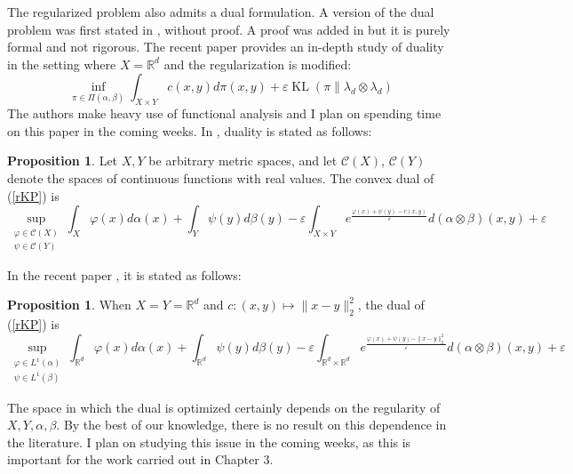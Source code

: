 \documentclass[12pt]{report}
\theoremstyle{definition}
\newtheorem{prop}[defi]{Proposition}
\theoremstyle{remark}
\DeclareMathOperator{\kl}{KL}
\begin{document}
The regularized problem also admits a dual formulation. A version of the dual problem was first stated in \cite{genevay2016stochastic}, without proof. A proof was added in \cite[Proposition~4]{genevay2019entropy} but it is purely formal and not rigorous. The recent paper \cite{clason2019entropic} provides an in-depth study of duality in the setting where $X=\mathbb R^d$ and the regularization is modified:
	\begin{equation*}
	\inf_{\pi\in \Pi(\alpha, \beta)} \int_{X\times Y} c(x,y) d\pi(x,y) + \varepsilon\kl(\pi\|\lambda_d\otimes \lambda_d)
	\end{equation*}
The authors make heavy use of functional analysis and I plan on spending time on this paper in the coming weeks. In \cite{genevay2016stochastic,genevay2018sample,genevay2019entropy}, duality is stated as follows:

\begin{prop}
	Let $X,Y$ be arbitrary metric spaces, and let $\mathcal C(X)$, $\mathcal C(Y)$ denote the spaces of continuous functions with real values. The convex dual of (\ref{rKP}) is 
	\begin{equation*}\tag{Dual Reg. KP 1}\label{dualrKP}
		\sup_{\substack{\varphi \in \mathcal C(X)\\\psi \in \mathcal C(Y)}} \int_X \varphi(x) d\alpha(x) + \int_Y \psi(y) d\beta(y) -\varepsilon \int_{X\times Y} e^{\frac{\varphi(x)+\psi(y)-c(x,y)}\varepsilon} d(\alpha\otimes\beta)(x,y) + \varepsilon
	\end{equation*}
\end{prop}

In the recent paper \cite{mena2019statistical}, it is stated as follows:

\begin{prop}
	When $X=Y=\mathbb R^d$ and $c:(x,y)\mapsto \|x-y\|_2^2$, the dual of (\ref{rKP}) is 
	\begin{equation*}\tag{Dual Reg. KP 2}\label{dualrKP2}
		\sup_{\substack{\varphi \in L^1(\alpha)\\\psi \in L^1(\beta)}} \int_{\mathbb R^d} \varphi(x) d\alpha(x) + \int_{\mathbb R^d} \psi(y) d\beta(y) -\varepsilon \int_{\mathbb R^d\times \mathbb R^d} e^{\frac{\varphi(x)+\psi(y)-\|x-y\|_2^2}\varepsilon} d(\alpha\otimes\beta)(x,y) + \varepsilon
	\end{equation*}
\end{prop}

The space in which the dual is optimized certainly depends on the regularity of $X,Y, \alpha, \beta$. By the best of our knowledge, there is no result on this dependence in the literature. I plan on studying this issue in the coming weeks, as this is important for the work carried out in Chapter 3.
\end{document}
